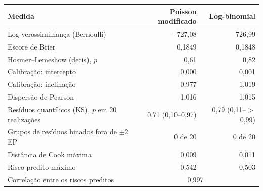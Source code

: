 \begin{tabular}{lrr}
\toprule
Medida & Poisson modificado & Log-binomial \\
\midrule
Log-verossimilhança (Bernoulli) & $-$727,08 & $-$726,99 \\
Escore de Brier & 0,1849 & 0,1848 \\
Hosmer--Lemeshow (decis), $p$ & 0,61 & 0,82 \\
Calibração: intercepto & 0,000 & 0,001 \\
Calibração: inclinação & 0,977 & 1,019 \\
Dispersão de Pearson & 1,016 & 1,015 \\
Resíduos quantílicos (KS), $p$ em 20 realizações & 0,71 (0,10--0,97) & 0,79 (0,11--$>$0,99) \\
Grupos de resíduos binados fora de $\pm$2 EP & 0 de 20 & 0 de 20 \\
Distância de Cook máxima & 0,009 & 0,011 \\
Risco predito máximo & 0,542 & 0,503 \\
\midrule
Correlação entre os riscos preditos & \multicolumn{2}{c}{0,997} \\
\bottomrule
\end{tabular}
